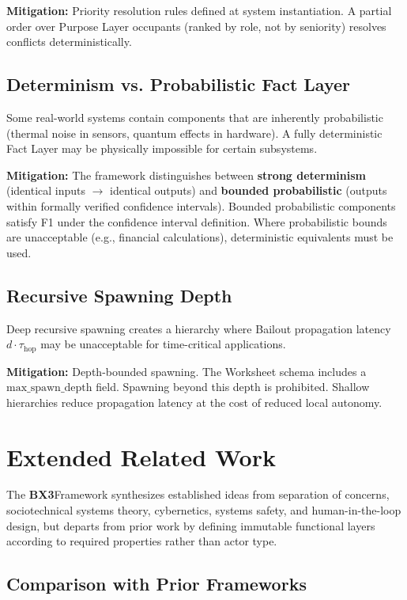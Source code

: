 \documentclass[12pt]{article}
\newcommand{\bxthree}{\textbf{BX3}}
\begin{document}
\textbf{Mitigation:} Priority resolution rules defined at system instantiation. A partial order over Purpose Layer occupants (ranked by role, not by seniority) resolves conflicts deterministically.

\subsection{Determinism vs. Probabilistic Fact Layer}
Some real-world systems contain components that are inherently probabilistic (thermal noise in sensors, quantum effects in hardware). A fully deterministic Fact Layer may be physically impossible for certain subsystems.

\textbf{Mitigation:} The framework distinguishes between \textbf{strong determinism} (identical inputs $\rightarrow$ identical outputs) and \textbf{bounded probabilistic} (outputs within formally verified confidence intervals). Bounded probabilistic components satisfy F1 under the confidence interval definition. Where probabilistic bounds are unacceptable (e.g., financial calculations), deterministic equivalents must be used.

\subsection{Recursive Spawning Depth}
Deep recursive spawning creates a hierarchy where Bailout propagation latency $d \cdot \tau_{\text{hop}}$ may be unacceptable for time-critical applications.

\textbf{Mitigation:} Depth-bounded spawning. The Worksheet schema includes a $\text{max\_spawn\_depth}$ field. Spawning beyond this depth is prohibited. Shallow hierarchies reduce propagation latency at the cost of reduced local autonomy.

\section{Extended Related Work}
\label{sec:prior}

The \bxthree Framework synthesizes established ideas from separation of concerns, sociotechnical systems theory, cybernetics, systems safety, and human-in-the-loop design, but departs from prior work by defining immutable functional layers according to required properties rather than actor type.

\subsection{Comparison with Prior Frameworks}
\end{document}

